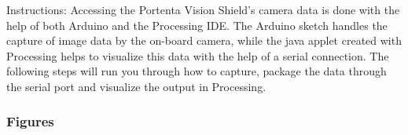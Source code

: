 \documentclass[10pt, a4paper]{beamer}
\begin{document}
	\begin{frame}
		
		\begin{block}{Instructions:}
			Accessing the Portenta Vision Shield's camera data is done with the help of both Arduino and the Processing IDE. The Arduino sketch handles the capture of image data by the on-board camera, while the java applet created with Processing helps to visualize this data with the help of a serial connection. The following steps will run you through how to capture, package the data through the serial port and visualize the output in Processing.
		\end{block}
		
	\end{frame}
	
	\begin{frame}
		\frametitle{Figures}
		

\end{frame}
\end{document}
